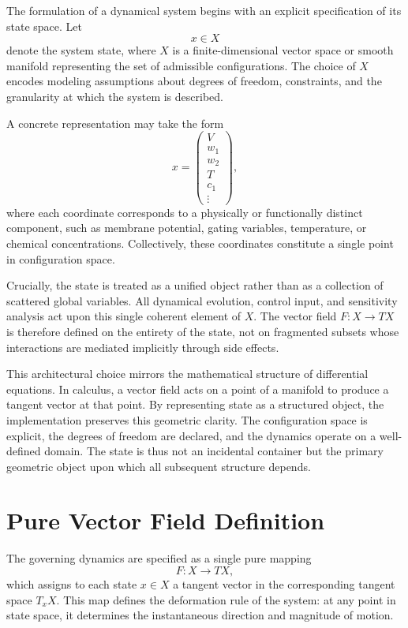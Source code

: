 \documentclass[12pt]{book}
\begin{document}
The formulation of a dynamical system begins with an explicit
specification of its state space. Let
\[
x \in X
\]
denote the system state, where $X$ is a finite-dimensional vector
space or smooth manifold representing the set of admissible
configurations. The choice of $X$ encodes modeling assumptions about
degrees of freedom, constraints, and the granularity at which the
system is described.

A concrete representation may take the form
\[
x =
\begin{pmatrix}
V \\
w_1 \\
w_2 \\
T \\
c_1 \\
\vdots
\end{pmatrix},
\]
where each coordinate corresponds to a physically or functionally
distinct component, such as membrane potential, gating variables,
temperature, or chemical concentrations. Collectively, these
coordinates constitute a single point in configuration space.

Crucially, the state is treated as a unified object rather than as a
collection of scattered global variables. All dynamical evolution,
control input, and sensitivity analysis act upon this single coherent
element of $X$. The vector field $F : X \to TX$ is therefore defined
on the entirety of the state, not on fragmented subsets whose
interactions are mediated implicitly through side effects.

This architectural choice mirrors the mathematical structure of
differential equations. In calculus, a vector field acts on a point of
a manifold to produce a tangent vector at that point. By representing
state as a structured object, the implementation preserves this
geometric clarity. The configuration space is explicit, the degrees of
freedom are declared, and the dynamics operate on a well-defined
domain. The state is thus not an incidental container but the primary
geometric object upon which all subsequent structure depends.

\section{Pure Vector Field Definition}

The governing dynamics are specified as a single pure mapping
\[
F : X \to TX,
\]
which assigns to each state $x \in X$ a tangent vector in the
corresponding tangent space $T_x X$. This map defines the deformation
rule of the system: at any point in state space, it determines the
instantaneous direction and magnitude of motion.
\end{document}
